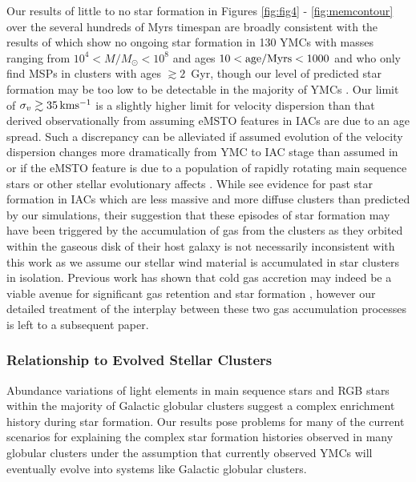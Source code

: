 \documentclass[fleqn,usenatbib]{mnras}
\begin{document}
 Our results of little to no star formation in Figures \ref{fig:fig4} - \ref{fig:memcontour} over the several hundreds of Myrs timespan are broadly consistent with the results of \cite{bastian2013a} which show no ongoing star formation in 130 YMCs with masses ranging from $10^4 < M/M_\odot < 10^8$ and ages $10 < {\rm age/Myrs} < 1000$ and \cite{mart2018} who only find MSPs in clusters with ages $\gtrsim 2$~Gyr, though our level of predicted star formation may be too low to be detectable in the majority of YMCs \citep{peacock2013}.
  Our limit of $\sigma_v \gtrsim 35 \, {\rm km s^{-1}}$ is a slightly higher limit for velocity dispersion than that derived observationally from assuming eMSTO features in IACs \citep{goud2014} are due to an age spread.  Such a discrepancy can be alleviated if assumed evolution of the velocity dispersion changes more dramatically from YMC to IAC stage than assumed in \cite{goud2014} or if the eMSTO feature is due to a population of rapidly rotating main sequence stars  \citep{cabrera2016,bastian2016,piatti2016} or other stellar evolutionary affects \citep{bastian2017}.
While \cite{li2016} see evidence for past star formation in IACs which are less massive and more diffuse clusters than predicted by our simulations, their suggestion that these episodes of star formation may have been triggered by the accumulation of gas from the clusters as they orbited within the gaseous disk of their host galaxy is not necessarily inconsistent with this work as we assume our stellar wind material is accumulated in star clusters in isolation.  Previous work has shown that cold gas accretion may indeed be a viable avenue for significant gas retention and star formation \citep{naiman2009,conroy2011a,conroy2011b,priestley2011,naiman2011,conroy2012}, however our detailed treatment of the interplay between these two gas accumulation processes is left to a subsequent paper. 

\subsubsection{Relationship to Evolved Stellar Clusters}

 Abundance variations of light elements in main sequence stars \citep{gratton2001,briley2002,cohen2002,cannon1998,pancino2010b} and RGB stars \citep{sneden2004} within the majority of Galactic globular clusters suggest a complex enrichment history during star formation.
 Our results pose problems for many of the current scenarios for explaining the complex star formation histories observed in many globular clusters under the assumption that currently observed YMCs will eventually evolve into systems like Galactic globular clusters.
\end{document}
